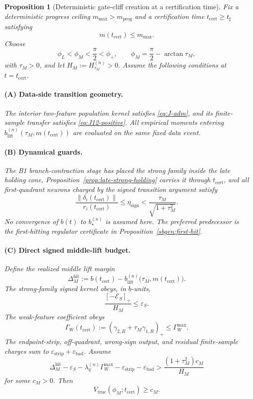 \documentclass{article} %
\theoremstyle{plain}
\newtheorem{proposition}[theorem]{Proposition}
\theoremstyle{definition}
\theoremstyle{remark}
\begin{document}
\begin{proposition}[Deterministic gate-cliff creation at a certification time]
\label{prop:gate-cliff-creation}
Fix a deterministic progress ceiling
$m_{\max}>m_{\mathrm{prog}}$ and a certification time
$t_{\mathrm{cert}}\ge t_{\sharp}$ satisfying
\[
m(t_{\mathrm{cert}})\le m_{\max}.
\]
Choose
\[
\phi_L<\phi_M<\frac\pi2<\phi_+,
\qquad
\phi_M=\frac\pi2-\arctan\tau_M,
\]
with $\tau_M>0$, and let
$H_M:=H_{\tau_M}^{(n)}>0$.
Assume the following conditions at $t=t_{\mathrm{cert}}$.

\paragraph{(A) Data-side transition geometry.}
The interior two-feature population kernel satisfies
\eqref{eq:J-adm}, and its finite-sample transfer satisfies
\eqref{eq:J12-positive}.  All empirical moments entering
$b_{\mathrm{lift}}^{(n)}(\tau_M,m(t_{\mathrm{cert}}))$ are evaluated on
the same fixed data event.

\paragraph{(B) Dynamical guards.}
The B1 branch-contraction stage has placed the strong family inside the late
holding cone, Proposition~\ref{prop:late-strong-holding} carries it through
$t_{\mathrm{cert}}$, and all first-quadrant neurons charged by the signed
transition argument satisfy
\[
\boxed{
\frac{\|\delta_i(t_{\mathrm{cert}})\|}{r_i(t_{\mathrm{cert}})}
\le
\eta_{\mathrm{sign}}
<
\frac{\tau_M}{\sqrt{1+\tau_M^2}}.
}
\tag{GC-sign-guard}\label{eq:GC-sign-guard}
\]
No convergence of $b(t)$ to $b_\star^{(n)}$ is assumed here.  The preferred
predecessor is the first-hitting regulator certificate in
Proposition~\ref{sbgen:first-hit}.

\paragraph{(C) Direct signed middle-lift budget.}
Define the realized middle lift margin
\[
\boxed{
\Delta_M^{\mathrm{hit}}
:=
b(t_{\mathrm{cert}})
-
b_{\mathrm{lift}}^{(n)}
\bigl(\tau_M,m(t_{\mathrm{cert}})\bigr).
}
\tag{GC-lift-margin}\label{eq:GC-lift-margin}
\]
The strong-family signed kernel obeys, in $b$-units,
\[
\frac{[-\mathcal E_S]_+}{H_M}
\le
\varepsilon_S.
\]
The weak-feature coefficient obeys
\[
\boxed{
\Gamma_W(t_{\mathrm{cert}})
:=
(\gamma_{2,R}+\tau_M\gamma_{1,R})_+
\le
\Gamma_W^{\max}.
}
\tag{GC-weak-timing}\label{eq:GC-weak-timing}
\]
The endpoint-strip, off-quadrant, wrong-sign output, and residual finite-sample
charges sum to
$\varepsilon_{\mathrm{strip}}+\varepsilon_{\mathrm{bad}}$.
Assume
\[
\boxed{
\Delta_M^{\mathrm{hit}}
-
\varepsilon_S
-
\lambda_q^{(n)}\Gamma_W^{\max}
-
\varepsilon_{\mathrm{strip}}
-
\varepsilon_{\mathrm{bad}}
>
\frac{(1+\tau_M^2)c_M}{H_M}
}
\tag{GC-middle-budget}\label{eq:GC-middle-budget}
\]
for some $c_M>0$.  Then
\[
\boxed{
V_{\mathrm{true}}(\phi_M;t_{\mathrm{cert}})\ge c_M.
}
\tag{GC-middle-sign}\label{eq:GC-middle-sign}
\]


\end{proposition}
\end{document}
